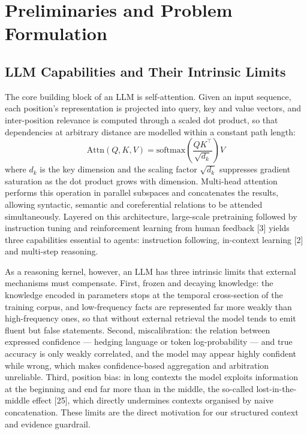 \documentclass[journal,10pt,a4paper]{IEEEtran}
\begin{document}
\section{Preliminaries and Problem Formulation}
\label{sec:prelim}
\subsection{LLM Capabilities and Their Intrinsic Limits}
The core building block of an LLM is self-attention. Given an input sequence, each position's representation is projected into query, key and value vectors, and inter-position relevance is computed through a scaled dot product, so that dependencies at arbitrary distance are modelled within a constant path length:
\begin{equation}
\mathrm{Attn}(Q,K,V)=\mathrm{softmax}\!\left(\frac{QK^{\top}}{\sqrt{d_k}}\right)V
\end{equation}
where $d_k$ is the key dimension and the scaling factor $\sqrt{d_k}$ suppresses gradient saturation as the dot product grows with dimension. Multi-head attention performs this operation in parallel subspaces and concatenates the results, allowing syntactic, semantic and coreferential relations to be attended simultaneously. Layered on this architecture, large-scale pretraining followed by instruction tuning and reinforcement learning from human feedback [3] yields three capabilities essential to agents: instruction following, in-context learning [2] and multi-step reasoning.

As a reasoning kernel, however, an LLM has three intrinsic limits that external mechanisms must compensate. First, frozen and decaying knowledge: the knowledge encoded in parameters stops at the temporal cross-section of the training corpus, and low-frequency facts are represented far more weakly than high-frequency ones, so that without external retrieval the model tends to emit fluent but false statements. Second, miscalibration: the relation between expressed confidence --- hedging language or token log-probability --- and true accuracy is only weakly correlated, and the model may appear highly confident while wrong, which makes confidence-based aggregation and arbitration unreliable. Third, position bias: in long contexts the model exploits information at the beginning and end far more than in the middle, the so-called lost-in-the-middle effect [25], which directly undermines contexts organised by naive concatenation. These limits are the direct motivation for our structured context and evidence guardrail.
\end{document}
